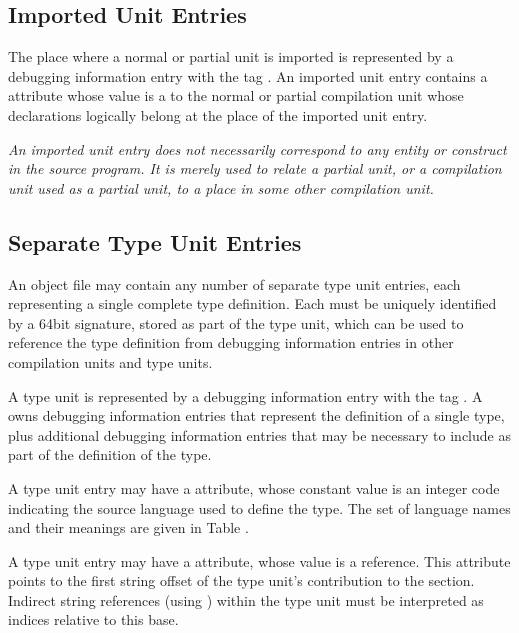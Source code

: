 \subsection{Imported Unit Entries}
\label{chap:importedunitentries}
The 
\hypertarget{chap:DWATimportimportedunit}{}
place where a normal or partial unit is imported is
represented by a debugging information entry with the 
tag \DWTAGimportedunitTARG. 
An imported unit entry contains 
a
\DWATimport{} attribute 
whose value is a  to the
normal or partial compilation unit whose declarations logically
belong at the place of the imported unit entry.

\textit{An imported unit entry does not necessarily correspond to
any entity or construct in the source program. It is merely
 used to relate a partial unit, or a compilation
unit used as a partial unit, to a place in some other
compilation unit.}

\subsection{Separate Type Unit Entries}
\label{chap:separatetypeunitentries}
An object file may contain any number of separate type
unit entries, each representing a single complete type
definition. 
Each  must be uniquely identified by
a 64\dash bit signature, stored as part of the type unit, which
can be used to reference the type definition from debugging
information entries in other compilation units and type units.

A type unit is represented by a debugging information entry
with the tag \DWTAGtypeunitTARG. 
A  owns debugging
information entries that represent the definition of a single
type, plus additional debugging information entries that may
be necessary to include as part of the definition of the type.

A type unit entry may have a 
\DWATlanguage{} attribute, 
whose
constant value is an integer code indicating the source
language used to define the type. The set of language names
and their meanings are given in Table .

A type unit entry may have a 
\DWATstroffsetsbase{}
attribute, whose value is a reference. This attribute points
to the first string offset of the type unit's contribution to
the \dotdebugstroffsets{} section. Indirect string references
(using \DWFORMstrx) within the type unit must be interpreted
as indices relative to this base.

